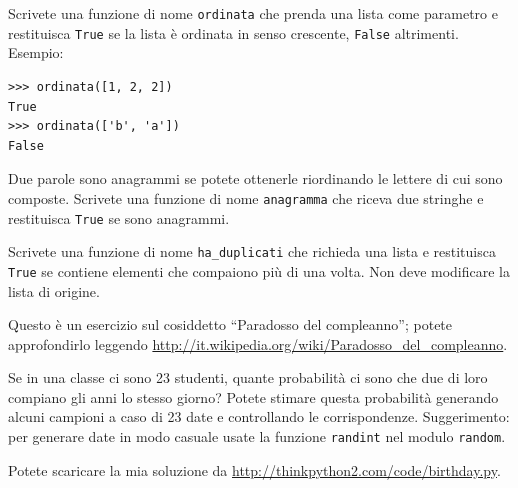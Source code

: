\documentclass[10pt]{book}
\begin{document}
\vspace{0.2in}
\begin{exercise}
Scrivete una funzione di nome \verb"ordinata" che prenda una lista come parametro e restituisca {\tt True} se la lista è ordinata in senso crescente, {\tt False} altrimenti. Esempio:

\begin{verbatim}
>>> ordinata([1, 2, 2])
True
>>> ordinata(['b', 'a'])
False
\end{verbatim}

\end{exercise}

\vspace{0.2in}
\begin{exercise}
\label{anagram}

Due parole sono anagrammi se potete ottenerle riordinando le lettere di cui sono composte. Scrivete una funzione di nome \verb"anagramma"
che riceva due stringhe e restituisca {\tt True} se sono anagrammi.
\end{exercise}

\vspace{0.2in}
\begin{exercise}
\label{duplicate}

Scrivete una funzione di nome \verb"ha_duplicati" che richieda una lista e restituisca {\tt True} se contiene elementi che compaiono più di una volta. Non deve modificare la lista di origine.

\end{exercise}

\vspace{0.2in}
\begin{exercise}

Questo è un esercizio sul cosiddetto ``Paradosso del compleanno''; potete approfondirlo leggendo \url{http://it.wikipedia.org/wiki/Paradosso_del_compleanno}.

Se in una classe ci sono 23 studenti, quante probabilità ci sono che due di loro compiano gli anni lo stesso giorno? Potete stimare questa probabilità generando alcuni campioni a caso di 23 date e controllando le corrispondenze. Suggerimento: per generare date in modo casuale usate la funzione {\tt randint} nel modulo {\tt random}.

Potete scaricare la mia soluzione da \url{http://thinkpython2.com/code/birthday.py}.

\end{exercise}
\end{document}
